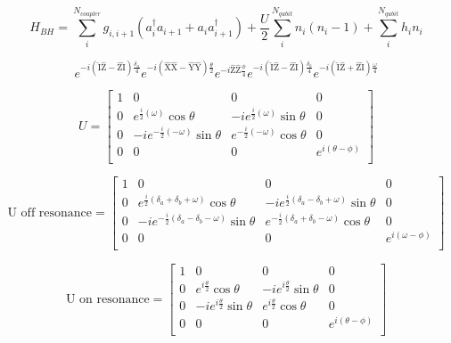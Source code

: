 \begin{equation}
    H_{BH} = \sum_{i}^{N_{coupler}} g_{i,i+1} \left( a^\dagger_{i} a_{i+1} +a_{i} a^\dagger_{i+1} \right)+ \frac{U}{2}\sum_{i}^{N_{qubit}}n_i(n_i-1) + \sum_{i}^{N_{qubit}} h_i n_i
\end{equation}

\begin{equation}
    e^{-i \left( \hat{\text{I}} \hat{\text{Z}} - \hat{\text{Z}} \hat{\text{I}} \right) \frac{\delta_{a}}{4} }
    e^{-i \left( \hat{\text{X}} \hat{\text{X}} - \hat{\text{Y}} \hat{\text{Y}} \right) \frac{\theta}{2} }
    e^{-i \hat{\text{Z}} \hat{\text{Z}}  \frac{\phi}{4} }
    e^{-i \left( \hat{\text{I}} \hat{\text{Z}} - \hat{\text{Z}} \hat{\text{I}} \right) \frac{\delta_{b}}{4} }
    e^{-i \left( \hat{\text{I}} \hat{\text{Z}} + \hat{\text{Z}} \hat{\text{I}} \right) \frac{\omega}{4} }
\end{equation}

\begin{equation}
    U=
    \begin{bmatrix}
        1 & 0 & 0 & 0 \\
        0 & e^{ \frac{i}{2} (\omega)} \cos{\theta} & -i e^{ \frac{i}{2} (\omega)}\sin{\theta} & 0 \\
        0 & -i e^{ - \frac{i}{2} (- \omega)}\sin{\theta} & e^{ -\frac{i}{2} ( - \omega)}\cos{\theta} & 0 \\
        0 & 0 & 0 & e^{i (\theta-\phi)} \\
    \end{bmatrix}
\end{equation}


\begin{equation}
    \textrm{U off resonance}=
    \begin{bmatrix}
        1 & 0 & 0 & 0 \\
        0 & e^{ \frac{i}{2} (\delta_{a} + \delta_{b} + \omega)}\cos{\theta} & -i e^{ \frac{i}{2} (\delta_{a} - \delta_{b} + \omega)}\sin{\theta} & 0 \\
        0 & -i e^{ - \frac{i}{2} (\delta_{a} - \delta_{b} - \omega)}\sin{\theta} & e^{ -\frac{i}{2} (\delta_{a} + \delta_{b} - \omega)}\cos{\theta} & 0 \\
        0 & 0 & 0 & e^{i (\omega-\phi)} \\
    \end{bmatrix}
\end{equation}

\begin{equation}
    \text{U on resonance}=
    \begin{bmatrix}
        1 & 0 & 0 & 0 \\
        0 & e^{ i \frac{\theta}{2} } \cos{\theta} & -i e^{i \frac{\theta}{2} } \sin{\theta}  & 0 \\
        0 & -i  e^{ i \frac{\theta}{2} } \sin{\theta} & e^{i \frac{\theta}{2}} \cos{\theta} & 0 \\
        0 & 0 & 0 & e^{i (\theta-\phi)} \\
    \end{bmatrix}
\end{equation}

